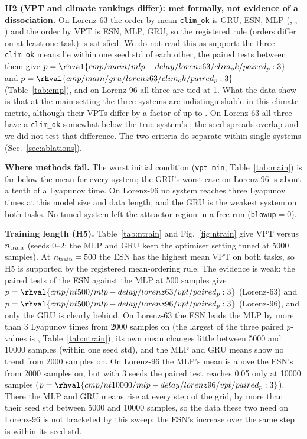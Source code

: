 \textbf{H2 (VPT and climate rankings differ): met formally, not evidence of a dissociation.} On Lorenz-63 the order by mean \texttt{clim\_ok} is GRU, ESN, MLP (, , ) and the order by VPT is ESN, MLP, GRU, so the registered rule (orders differ on at least one task) is satisfied. We do not read this as support: the three \texttt{clim\_ok} means lie within one seed std of each other, the paired tests between them give $p=\rhval{cmp/main/mlp-delay/lorenz63/clim_ok/paired_p:3}$ and $p=\rhval{cmp/main/gru/lorenz63/clim_ok/paired_p:3}$ (Table~\ref{tab:cmp}), and on Lorenz-96 all three are tied at 1. What the data show is that at the main setting the three systems are indistinguishable in this climate metric, although their VPTs differ by a factor of up to . On Lorenz-63 all three have a \texttt{clim\_ok} somewhat below the true system's ; the seed spreads overlap and we did not test that difference. The two criteria do separate within single systems (Sec.~\ref{sec:ablations}).

\textbf{Where methods fail.} The worst initial condition (\texttt{vpt\_min}, Table~\ref{tab:main}) is far below the mean for every system; the GRU's worst case on Lorenz-96 is about a tenth of a Lyapunov time. On Lorenz-96 no system reaches three Lyapunov times at this model size and data length, and the GRU is the weakest system on both tasks. No tuned system left the attractor region in a free run (\texttt{blowup}$=0$).

\textbf{Training length (H5).} Table~\ref{tab:ntrain} and Fig.~\ref{fig:ntrain} give VPT versus $n_{\rm train}$ (seeds 0--2; the MLP and GRU keep the optimiser setting tuned at 5000 samples). At $n_{\rm train}=500$ the ESN has the highest mean VPT on both tasks, so H5 is supported by the registered mean-ordering rule. The evidence is weak: the paired tests of the ESN against the MLP at 500 samples give $p=\rhval{cmp/nt500/mlp-delay/lorenz63/vpt/paired_p:3}$ (Lorenz-63) and $p=\rhval{cmp/nt500/mlp-delay/lorenz96/vpt/paired_p:3}$ (Lorenz-96), and only the GRU is clearly behind. On Lorenz-63 the ESN leads the MLP by more than 3 Lyapunov times from 2000 samples on (the largest of the three paired $p$-values is , Table~\ref{tab:ntrain}); its own mean changes little between 5000 and 10000 samples (within one seed std), and the MLP and GRU means show no trend from 2000 samples on. On Lorenz-96 the MLP's mean is above the ESN's from 2000 samples on, but with 3 seeds the paired test reaches 0.05 only at 10000 samples ($p=\rhval{cmp/nt10000/mlp-delay/lorenz96/vpt/paired_p:3}$). There the MLP and GRU means rise at every step of the grid, by more than their seed std between 5000 and 10000 samples, so the data these two need on Lorenz-96 is not bracketed by this sweep; the ESN's increase over the same step is within its seed std.


